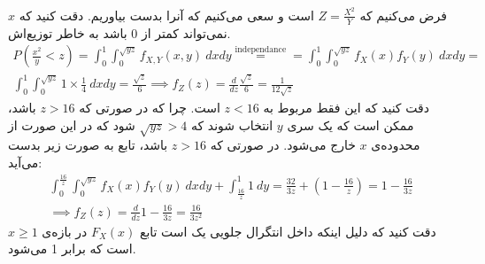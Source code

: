 \\
فرض می‌کنیم که
$Z = \frac{X^2}{Y}$
است و سعی می‌کنیم که
آنرا بدست بیاوریم. دقت کنید که 
$x$
نمی‌تواند کمتر از 0 باشد به خاطر توزیع‌اش.
\begin{gather*}
    P(\frac{x^2}{y} < z) = \int_0^{1} \int_{0}^{\sqrt{yz}} f_{X,Y}(x,y) ~ dxdy \stackrel{\text{independance}}{=} =
    \int_0^{1} \int_{0}^{\sqrt{yz}} f_X(x)f_Y(y) ~ dxdy =\\
    \int_0^{1} \int_{0}^{\sqrt{yz}} 1 \times \frac{1}{4} ~ dxdy = \frac{\sqrt{z}}{6} \implies
    f_Z(z) = \frac{d}{dz} \frac{\sqrt{z}}{6} = \frac{1}{12 \sqrt{z}}
\end{gather*}
دقت کنید که این
فقط مربوط به
$z < 16$
است. چرا که در صورتی که
$z > 16$
باشد، ممکن است که یک سری
$y$
انتخاب شوند که
$\sqrt{yz} > 4$
شود که در این صورت از محدوده‌ی
$x$
خارج می‌شود. در صورتی که
$z > 16$
باشد،
تابع به صورت زیر بدست می‌آید:
\begin{gather*}
    \int_0^{\frac{16}{z}} \int_{0}^{\sqrt{yz}} f_X(x)f_Y(y) ~ dxdy + \int_{\frac{16}{z}}^1 1 ~ dy
    = \frac{32}{3z} + (1 - \frac{16}{z}) = 1 - \frac{16}{3z}\\
    \implies f_Z(z) = \frac{d}{dz} 1 - \frac{16}{3z} = \frac{16}{3z^2}
\end{gather*}
دقت کنید که دلیل اینکه داخل انتگرال جلویی یک است تابع
$F_X(x)$
در بازه‌ی
$x \ge 1$
است که برابر 1 می‌شود.


